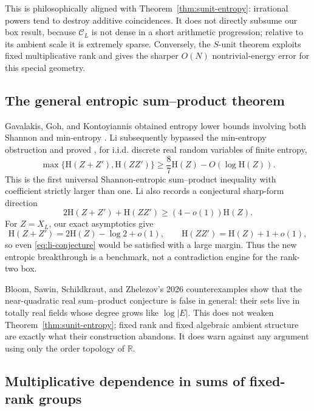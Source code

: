 \documentclass[11pt,oneside]{article}
\theoremstyle{definition}
\theoremstyle{remark}
\newcommand{\R}{\mathbb{R}}
\newcommand{\HH}{\mathrm{H}}
\newcommand{\abs}[1]{\left|#1\right|}
\begin{document}
This is philosophically aligned with Theorem~\ref{thm:sunit-entropy}: irrational powers tend to destroy additive coincidences.  It does not directly subsume our box result, because \(\mathcal C_L\) is not dense in a short arithmetic progression; relative to its ambient scale it is extremely sparse.  Conversely, the $S$-unit theorem exploits fixed multiplicative rank and gives the sharper \(O(N)\) nontrivial-energy error for this special geometry.

\subsection{The general entropic sum--product theorem}

Gavalakis, Goh, and Kontoyiannis obtained entropy lower bounds involving both Shannon and min-entropy \cite{GavalakisGohKontoyiannis2026}.  Li subsequently bypassed the min-entropy obstruction and proved \cite{Li2026}, for i.i.d. discrete real random variables of finite entropy,
\begin{equation}\label{eq:li-87}
 \max\{\HH(Z+Z'),\HH(ZZ')\}
 \geq\frac87\HH(Z)-O(\log\HH(Z)).
\end{equation}
This is the first universal Shannon-entropic sum--product inequality with coefficient strictly larger than one.  Li also records a conjectural sharp-form direction
\begin{equation}\label{eq:li-conjecture}
 2\HH(Z+Z')+\HH(ZZ')\geq(4-o(1))\HH(Z).
\end{equation}
For \(Z=X_L\), our exact asymptotics give
\[
 \HH(Z+Z')=2\HH(Z)-\log2+o(1),
 \qquad
 \HH(ZZ')=\HH(Z)+1+o(1),
\]
so even \eqref{eq:li-conjecture} would be satisfied with a large margin.  Thus the new entropic breakthrough is a benchmark, not a contradiction engine for the rank-two box.

Bloom, Sawin, Schildkraut, and Zhelezov's 2026 counterexamples \cite{BloomEtAl2026} show that the near-quadratic real sum--product conjecture is false in general: their sets live in totally real fields whose degree grows like \(\log\abs E\).  This does not weaken Theorem~\ref{thm:sunit-entropy}; fixed rank and fixed algebraic ambient structure are exactly what their construction abandons.  It does warn against any argument using only the order topology of \(\R\).

\subsection{Multiplicative dependence in sums of fixed-rank groups}
\end{document}
